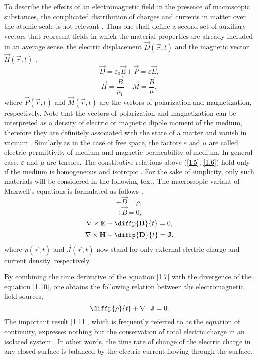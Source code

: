 To describe the effects of an electromagnetic field in the presence of macroscopic substances, the complicated distribution of charges and currents in matter over the atomic scale is not relevant \cite{Jackson2005}. Thus one shall define a second set of auxiliary vectors that represent fields in which the material properties are already included in an average sense, the electric displacement $ \vec{D}\left( \vec{r}, t \right) $ and the magnetic vector $ \vec{H}\left( \vec{r}, t \right) $ \cite{Feynman1963},
\begin{equation}
\label{1.5}
\vec{D} = \varepsilon_0 \vec{E} + \vec{P} = \varepsilon \vec{E},
\end{equation}
\begin{equation}
\label{1.6}
\vec{H} = \frac{\vec{B}}{\mu_0} - \vec{M} = \frac{\vec{B}}{\mu},
\end{equation}
where $ \vec{P}\left( \vec{r}, t \right) $ and $ \vec{M}\left( \vec{r}, t \right) $ are the vectors of polarization and magnetization, respectively. Note that the vectors of polarization and magnetization can be interpreted as a density of electric or magnetic dipole moment of the medium, therefore they are definitely associated with the state of a matter and vanish in vacuum \cite{Stratton2007}. Similarly as in the case of free space, the factors $ \varepsilon $ and $ \mu $ are called electric permittivity of medium and magnetic permeability of medium. In general case, $ \varepsilon $ and $ \mu $ are tensors. The constitutive relations above (\ref{1.5}, \ref{1.6}) hold only if the medium is homogeneous and isotropic \cite{Thide2011}. For the sake of simplicity, only such materials will be considered in the following text. The macroscopic variant of Maxwell's equations is formulated as follows \cite{Stratton2007},
\begin{equation}
\label{1.7}
\div{\vec{D}} = \rho,
\end{equation}
\begin{equation}
\label{1.8}
\div{\vec{B}} = 0,
\end{equation}
\begin{equation}
\label{1.9}
\rot{\vec{E}} + \diffp{\vec{B}}{t} = 0,
\end{equation}
\begin{equation}
\label{1.10}
\rot{\vec{H}} - \diffp{\vec{D}}{t} = \vec{J},
\end{equation}
where $ \rho\left(\vec{r}, t \right) $ and $ \vec{J}\left(\vec{r}, t \right) $ now stand for only external electric charge and current density, respectively.

By combining the time derivative of the equation \ref{1.7} with the divergence of the equation \ref{1.10}, one obtains the following relation between the electromagnetic field sources,
\begin{equation}
\label{1.11}
\diffp{\rho}{t} + \div{\vec{J}} = 0.
\end{equation}
The important result \ref{1.11}, which is frequently referred to as the equation of continuity, expresses nothing but the conservation of total electric charge in an isolated system \cite{Feynman1963}. In other words, the time rate of change of the electric charge in any closed surface is balanced by the electric current flowing through the surface.